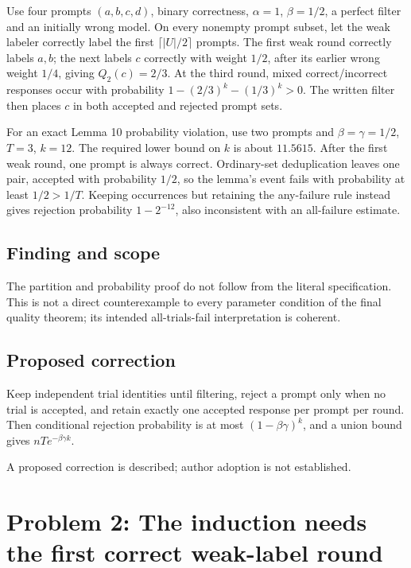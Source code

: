 \documentclass[11pt]{article}
\begin{document}
Use four prompts \((a,b,c,d)\), binary correctness, \(\alpha=1\), \(\beta=1/2\), a perfect filter and an initially wrong model. On every nonempty prompt subset, let the weak labeler correctly label the first \(\lceil|U|/2\rceil\) prompts. The first weak round correctly labels \(a,b\); the next labels \(c\) correctly with weight \(1/2\), after its earlier wrong weight \(1/4\), giving \(Q_2(c)=2/3\). At the third round, mixed correct/incorrect responses occur with probability \(1-(2/3)^k-(1/3)^k>0\). The written filter then places \(c\) in both accepted and rejected prompt sets.

For an exact Lemma 10 probability violation, use two prompts and \(\beta=\gamma=1/2\), \(T=3\), \(k=12\). The required lower bound on \(k\) is about \(11.5615\). After the first weak round, one prompt is always correct. Ordinary-set deduplication leaves one pair, accepted with probability \(1/2\), so the lemma’s event fails with probability at least \(1/2>1/T\). Keeping occurrences but retaining the any-failure rule instead gives rejection probability \(1-2^{-12}\), also inconsistent with an all-failure estimate.

\subsection*{Finding and scope}

The partition and probability proof do not follow from the literal specification. This is not a direct counterexample to every parameter condition of the final quality theorem; its intended all-trials-fail interpretation is coherent.

\subsection*{Proposed correction}

Keep independent trial identities until filtering, reject a prompt only when no trial is accepted, and retain exactly one accepted response per prompt per round. Then conditional rejection probability is at most \((1-\beta\gamma)^k\), and a union bound gives \(nT e^{-\beta\gamma k}\).

A proposed correction is described; author adoption is not established.

\section*{Problem 2: The induction needs the first correct weak-label round}
\end{document}
